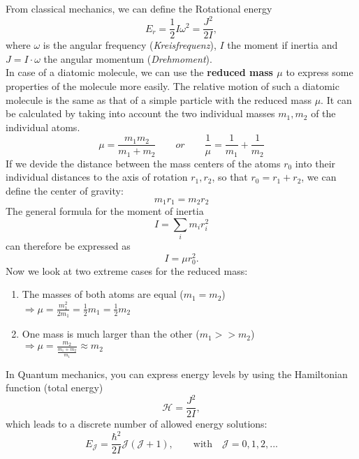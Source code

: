 \documentclass[a4paper,fleqn]{article}
\begin{document}
From classical mechanics, we can define the Rotational energy
\begin{equation}
E_r = \frac{1}{2} I \omega^2 = \frac{J^2}{2I},
\end{equation}
where $\omega$ is the angular frequency (\textit{Kreisfrequenz}), $I$ the moment if inertia and $J = I\cdot\omega$ the angular momentum (\textit{Drehmoment}).\\
In case of a diatomic molecule, we can use the \textbf{reduced mass $\mu$} to express some properties of the molecule more easily. The relative motion of such a diatomic molecule is the same as that of a simple particle with the reduced mass $\mu$. It can be calculated by taking into account the two individual masses $m_1, m_2$ of the individual atoms.
\begin{equation}
\mu = \frac{m_1 m_2}{m_1+m_2} \qquad or \qquad \frac{1}{\mu} = \frac{1}{m_1} + \frac{1}{m_2}
\end{equation}
If we devide the distance between the mass centers of the atoms $r_0$ into their individual distances to the axis of rotation $r_1, r_2$, so that $r_0 = r_1 + r_2$, we can define the center of gravity:
\begin{equation*}
m_1 r_1 = m_2 r_2
\end{equation*}
The general formula for the moment of inertia 
\begin{equation*}
I = \sum_i m_i r_i^2 
\end{equation*}
can therefore be expressed as 
\begin{equation}
I = \mu r_0^2.
\end{equation}
Now we look at two extreme cases for the reduced mass:
\begin{enumerate}
\item The masses of both atoms are equal ($m_1 = m_2$) \\
  $\Rightarrow \mu = \frac{m_1^2}{2m_1} = \frac{1}{2}m_1 = \frac{1}{2}m_2$
\item One mass is much larger than the other ($m_1 >> m_2$) \\
  $\Rightarrow \mu = \frac{m_2}{\frac{m_1 + m_2}{m_1}} \approx m_2$ 
\end{enumerate}
In Quantum mechanics, you can express energy levels by using the Hamiltonian function (total energy)
\begin{equation}
\mathcal{H}=\frac{J^2}{2I},
\end{equation}
which leads to a discrete number of allowed energy solutions:
\begin{equation}
E_\mathcal{J} = \frac{\hbar^2}{2I} \mathcal{J}(\mathcal{J}+1), \qquad \text{with} \quad \mathcal{J} = 0, 1, 2, ...
\end{equation}
\end{document}
